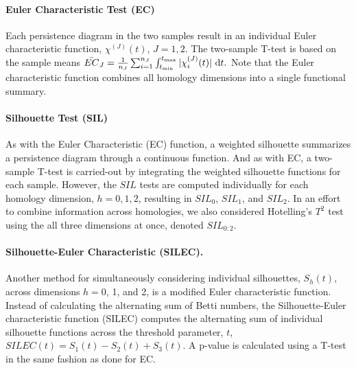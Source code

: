 \documentclass[12pt]{article}
\begin{document}
\paragraph{Euler Characteristic Test (EC)}
Each persistence diagram in the two samples result in an individual Euler characteristic function, $\chi^{(J)}(t)$,  $J = 1, 2$. The two-sample T-test is based on the sample means
$
\bar{EC}_J = \frac{1}{n_J}\sum_{i = 1}^{n_J} \int_{t_{\min}}^{t_{\max}} | \chi_i^{(J)}(t) | \textup{ d}t.
$
Note that the Euler characteristic function combines all homology dimensions into a single functional summary.



\paragraph{Silhouette Test (SIL)}
As with the Euler Characteristic (EC) function, a weighted silhouette summarizes a persistence diagram through a continuous function. And as with EC, a two-sample T-test is carried-out by integrating the weighted silhouette functions for each sample.  However, the $SIL$ tests are computed individually for each homology dimension, $h = 0, 1, 2$, resulting in $SIL_0$, $SIL_1$, and $SIL_2$. In an effort to combine information across homologies, we also considered Hotelling's $T^2$ test using the all three dimensions at once, denoted $SIL_{0:2}$.


\paragraph{Silhouette-Euler Characteristic (SILEC).}
Another method for simultaneously considering individual silhouettes, $S_{h}(t)$, across dimensions $h = 0$, 1, and 2, is a modified Euler characteristic function. Instead of calculating the alternating sum of Betti numbers, the Silhouette-Euler characteristic function (SILEC) computes the alternating sum of  individual silhouette functions across the threshold parameter, $t$, $SILEC(t) =  S_{1}(t) - S_{2}(t) + S_{3}(t)$. A p-value is calculated using a T-test in the same fashion as done for EC.
\end{document}
